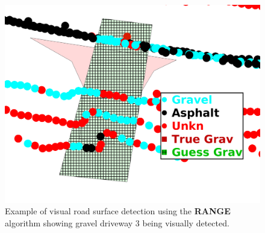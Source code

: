 \documentclass[numbered,pdftex]{ohio-etd}
\begin{document}
{{		\begin{figure}[H]
			\centering
			\includegraphics[width=0.95\linewidth]{Defense_Images/range_db_6_overlap_2}
			\caption[Visual Scores: RANGE]{Example of visual road surface detection using the \textbf{RANGE} algorithm showing gravel driveway $3$ being visually detected.}
			\label{fig:range_example_vis_score}
		\end{figure}
		
%		

}}
\end{document}
